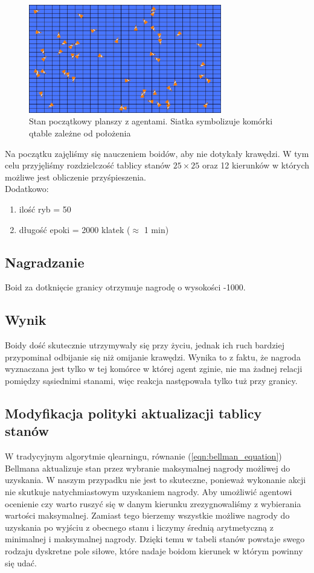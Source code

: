 \documentclass{article}
\begin{document}
\begin{figure}[H]
    \centering
    \includegraphics[width=0.75\textwidth]{1_Qtable_init.jpg}
    \caption[]{Stan początkowy planszy z agentami. Siatka symbolizuje komórki qtable zależne od położenia}
\end{figure}
Na początku zajęliśmy się nauczeniem boidów, aby nie dotykały krawędzi. W tym celu przyjęliśmy rozdzielczość tablicy stanów \(25\times25\) oraz 12 kierunków w których możliwe jest obliczenie przyśpieszenia.\\
Dodatkowo:
\begin{enumerate}
    \item ilość ryb = 50
    \item długość epoki = 2000 klatek (\(\approx\) 1 min)
\end{enumerate}
\subsection{Nagradzanie}
Boid za dotknięcie granicy otrzymuje nagrodę o wysokości -1000.
\subsection{Wynik}
Boidy dość skutecznie utrzymywały się przy życiu, jednak ich ruch bardziej przypominał odbijanie się niż omijanie krawędzi. Wynika to z faktu, że nagroda wyznaczana jest tylko w tej komórce w której agent zginie, nie ma żadnej relacji pomiędzy sąsiednimi stanami, więc reakcja następowała tylko tuż przy granicy.
\subsection{Modyfikacja polityki aktualizacji tablicy stanów}
W tradycyjnym algorytmie qlearningu, równanie (\ref{eqn:bellman_equation}) Bellmana aktualizuje stan przez wybranie maksymalnej nagrody możliwej do uzyskania. W naszym przypadku nie jest to skuteczne, ponieważ wykonanie akcji nie skutkuje natychmiastowym uzyskaniem nagrody. Aby umożliwić agentowi ocenienie czy warto ruszyć się w danym kierunku zrezygnowaliśmy z wybierania wartości maksymalnej. Zamiast tego bierzemy wszystkie możliwe nagrody do uzyskania po wyjściu z obecnego stanu i liczymy średnią arytmetyczną z minimalnej i maksymalnej nagrody. Dzięki temu w tabeli stanów powstaje swego rodzaju dyskretne pole siłowe, które nadaje boidom kierunek w którym powinny się udać.
\end{document}
